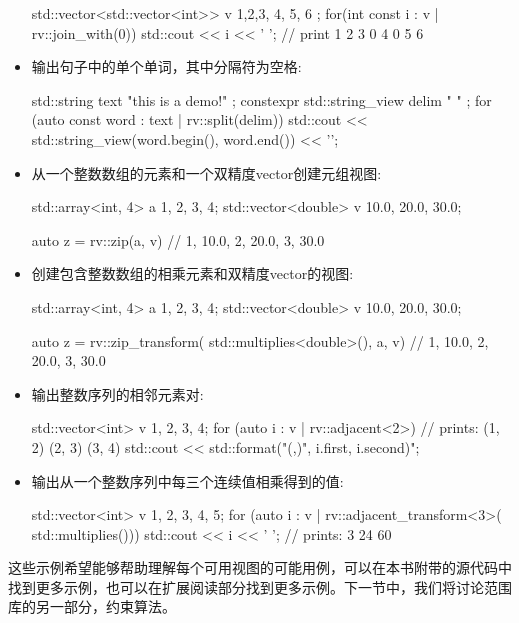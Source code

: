 \begin{itemize}
\begin{cpp}
std::vector<std::vector<int>> v{
	{1,2,3}, {4}, {5, 6}
};
for(int const i : v | rv::join_with(0))
	std::cout << i << ' '; // print 1 2 3 0 4 0 5 6
\end{cpp}

\item
输出句子中的单个单词，其中分隔符为空格:

\begin{cpp}
std::string text{ "this is a demo!" };
constexpr std::string_view delim{ " " };
for (auto const word : text | rv::split(delim))
{
	std::cout << std::string_view(word.begin(),
								  word.end())
			  << '\n';
}
\end{cpp}

\item
从一个整数数组的元素和一个双精度vector创建元组视图:

\begin{cpp}
std::array<int, 4> a {1, 2, 3, 4};
std::vector<double> v {10.0, 20.0, 30.0};

auto z = rv::zip(a, v)
// { {1, 10.0}, {2, 20.0}, {3, 30.0} }
\end{cpp}

\item
创建包含整数数组的相乘元素和双精度vector的视图:

\begin{cpp}
std::array<int, 4> a {1, 2, 3, 4};
std::vector<double> v {10.0, 20.0, 30.0};

auto z = rv::zip_transform(
	std::multiplies<double>(), a, v)
// { {1, 10.0}, {2, 20.0}, {3, 30.0} }
\end{cpp}

\item
输出整数序列的相邻元素对:

\begin{cpp}
std::vector<int> v {1, 2, 3, 4};
for (auto i : v | rv::adjacent<2>)
{
	// prints: (1, 2) (2, 3) (3, 4)
	std::cout << std::format("({},{})",
							 i.first, i.second)";
}
\end{cpp}

\item
输出从一个整数序列中每三个连续值相乘得到的值:

\begin{cpp}
std::vector<int> v {1, 2, 3, 4, 5};
for (auto i : v | rv::adjacent_transform<3>(
	std::multiplies()))
{
	std::cout << i << ' '; // prints: 3 24 60
}
\end{cpp}

\end{itemize}

这些示例希望能够帮助理解每个可用视图的可能用例，可以在本书附带的源代码中找到更多示例，也可以在扩展阅读部分找到更多示例。下一节中，我们将讨论范围库的另一部分，约束算法。












